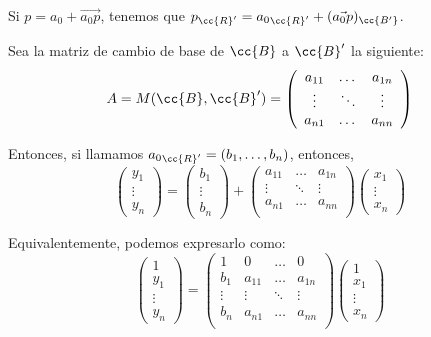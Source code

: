 Si $p=a_0+\vec{a_0p}$, tenemos que $p_{\cc{R}'}={a_0}_{\cc{R}'} + (\vec{a_0p})_{\cc{B'}}$.

Sea la matriz de cambio de base de $\cc{B}$ a $\cc{B}'$ la siguiente:
\begin{equation*}
    A=M(\cc{B},\cc{B}') = \left(\begin{array}{ccc}
        a_{11} & \dots & a_{1n}\\
        \vdots & \ddots & \vdots \\
        a_{n1} & \dots & a_{nn}\\
    \end{array}\right)
\end{equation*}

Entonces, si llamamos ${a_0}_{\cc{R}'}=(b_1,\dots, b_n)$, entonces,
\begin{equation*}
    \left(\begin{array}{c}
        y_1\\ \vdots \\ y_n
    \end{array}\right)
    = 
    \left(\begin{array}{c}
        b_1\\ \vdots \\ b_n
    \end{array}\right)
    +
    \left(\begin{array}{ccc}
        a_{11} & \dots & a_{1n}\\
        \vdots & \ddots & \vdots \\
        a_{n1} & \dots & a_{nn}\\
    \end{array}\right)
    \left(\begin{array}{c}
        x_1\\ \vdots \\ x_n
    \end{array}\right)
\end{equation*}

Equivalentemente, podemos expresarlo como:
\begin{equation*}
    \left(\begin{array}{c}
        1 \\ \hline
        y_1\\ \vdots \\ y_n
    \end{array}\right)
    = \left(\begin{array}{c|ccc}
        1 & 0 & \dots & 0 \\ \hline
        b_{1} & a_{11} & \dots & a_{1n}\\
        \vdots & \vdots & \ddots & \vdots \\
        b_{n} & a_{n1} & \dots & a_{nn}\\
    \end{array}\right)
    \left(\begin{array}{c}
        1\\ \hline
        x_1\\ \vdots \\ x_n
    \end{array}\right)
\end{equation*}


